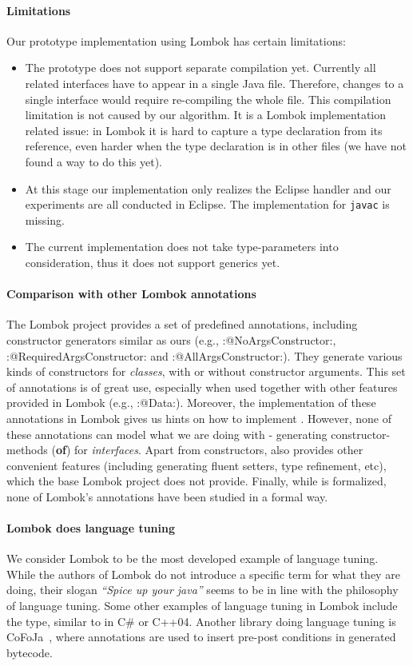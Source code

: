 \paragraph{Limitations}
Our prototype implementation using Lombok has certain limitations:
\begin{itemize}
\item The prototype does not support separate compilation yet. Currently all
  related interfaces have to appear in a single Java file. Therefore, changes to
  a single interface would require re-compiling the whole file. This compilation
  limitation is not caused by our algorithm. It is a Lombok implementation related
  issue: in Lombok it is hard to capture a type declaration from its reference,
  even harder when the type declaration is in other files (we have not found a
  way to do this yet).
\item At this stage our implementation only realizes the Eclipse handler and our
  experiments are all conducted in Eclipse. The implementation for
  \texttt{javac} is missing.
\item The current implementation does not take type-parameters into
  consideration, thus it does not support generics yet.
\end{itemize}

\paragraph{Comparison with other Lombok annotations}
The Lombok project provides a set of predefined annotations, including constructor
generators similar as ours (e.g., \Q:@NoArgsConstructor:,
\Q:@RequiredArgsConstructor: and \Q:@AllArgsConstructor:). They
generate various kinds of constructors for \emph{classes}, with or without
constructor arguments. This set of annotations is of great use, especially when
used together with other features provided in Lombok (e.g.,
\Q:@Data:). Moreover, the implementation of these annotations in Lombok
gives us hints on how to implement \mixin. However, none of these annotations
can model what we are doing with \mixin - generating constructor-methods
(\textbf{of}) for \emph{interfaces}. Apart from constructors, \mixin also
provides other convenient features (including generating fluent setters, type
refinement, etc), which the base Lombok project does not provide.
Finally, while \mixin is formalized, none of Lombok's annotations have been
studied in a formal way.

\paragraph{Lombok does language tuning}
We consider Lombok to be the most developed example of language
tuning.  While the authors of Lombok do not introduce a specific term
for what they are doing, their slogan \emph{``Spice up your java''}
seems to be in line with the philosophy of language tuning. Some
other examples of language tuning in Lombok include the \Q@val@ type,
similar to \Q@auto@ in C\# or C++04.  Another library doing language
tuning is CoFoJa~\cite{cofoja}, where annotations are used to insert
pre-post conditions in generated bytecode.


